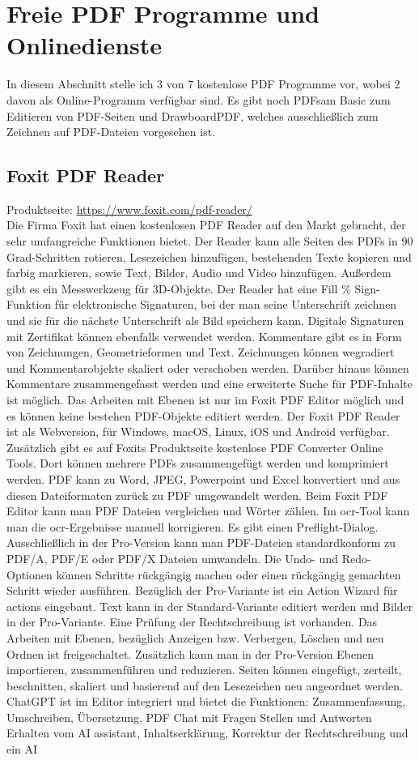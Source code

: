 \section{Freie PDF Programme und Onlinedienste}
In diesem Abschnitt stelle ich 3 von 7 kostenlose PDF Programme vor, wobei 2 davon als Online-Programm verfügbar sind. Es gibt noch PDFsam Basic zum Editieren von PDF-Seiten und DrawboardPDF, welches ausschließlich zum Zeichnen auf PDF-Dateien vorgesehen ist.

\subsection{Foxit PDF Reader}
Produktseite: \url{https://www.foxit.com/pdf-reader/} \\
Die Firma Foxit hat einen kostenlosen PDF Reader auf den Markt gebracht, der sehr umfangreiche Funktionen bietet. Der Reader kann alle Seiten des PDFs in 90 Grad-Schritten rotieren, Lesezeichen hinzufügen, bestehenden Texte kopieren und farbig markieren, sowie Text, Bilder, Audio und Video hinzufügen. Außerdem gibt es ein Messwerkzeug für 3D-Objekte. Der Reader hat eine Fill \% Sign-Funktion für elektronische Signaturen, bei der man seine Unterschrift zeichnen und sie für die nächste Unterschrift als Bild speichern kann. Digitale Signaturen mit Zertifikat können ebenfalls verwendet werden. Kommentare gibt es in Form von Zeichnungen, Geometrieformen und Text. Zeichnungen können wegradiert und Kommentarobjekte skaliert oder verschoben werden. Darüber hinaus können Kommentare zusammengefasst werden und eine erweiterte Suche für PDF-Inhalte ist möglich. Das Arbeiten mit Ebenen ist nur im Foxit PDF Editor möglich und es können keine bestehen PDF-Objekte editiert werden. Der Foxit PDF Reader ist als Webversion, für Windows, macOS, Linux, iOS und Android verfügbar. Zusätzlich gibt es auf Foxits Produktseite kostenlose PDF Converter Online Tools. Dort können mehrere PDFs zusammengefügt werden und komprimiert werden. PDF kann zu Word, JPEG, Powerpoint und Excel konvertiert und aus diesen Dateiformaten zurück zu PDF umgewandelt werden. Beim Foxit PDF Editor kann man PDF Dateien vergleichen und Wörter zählen. Im \gls{ocr}-Tool kann man die \gls{ocr}-Ergebnisse manuell korrigieren. Es gibt einen Preflight-Dialog. Ausschließlich in der Pro-Version kann man PDF-Dateien standardkonform zu PDF/A, PDF/E oder PDF/X Dateien umwandeln. Die Undo- und Redo-Optionen können Schritte rückgängig machen oder einen rückgängig gemachten Schritt wieder ausführen. Bezüglich der Pro-Variante ist ein Action Wizard für actions eingebaut. Text kann in der Standard-Variante editiert werden und Bilder in der Pro-Variante. Eine Prüfung der Rechtschreibung ist vorhanden. Das Arbeiten mit Ebenen, bezüglich Anzeigen bzw. Verbergen, Löschen und neu Ordnen ist freigeschaltet. Zusätzlich kann man in der Pro-Version Ebenen importieren, zusammenführen und reduzieren. Seiten können eingefügt, zerteilt, beschnitten, skaliert und basierend auf den Lesezeichen neu angeordnet werden. ChatGPT ist im Editor integriert und bietet die Funktionen: Zusammenfassung, Umschreiben, Übersetzung, PDF Chat mit Fragen Stellen und Antworten Erhalten vom AI assistant, Inhaltserklärung, Korrektur der Rechtschreibung und ein AI 